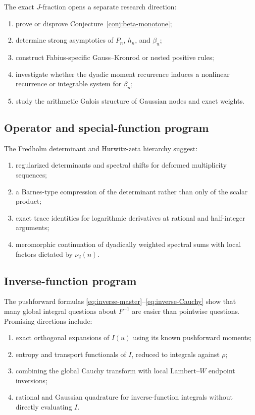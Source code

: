 \documentclass[11pt]{article}
\theoremstyle{definition}
\theoremstyle{remark}
\begin{document}
The exact \(J\)-fraction opens a separate research direction:

\begin{enumerate}
\item prove or disprove Conjecture~\ref{conj:beta-monotone};
\item determine strong asymptotics of \(P_n\), \(h_n\), and \(\beta_n\);
\item construct Fabius-specific Gauss--Kronrod or nested positive rules;
\item investigate whether the dyadic moment recurrence induces a nonlinear recurrence or
      integrable system for \(\beta_n\);
\item study the arithmetic Galois structure of Gaussian nodes and exact weights.
\end{enumerate}

\subsection{Operator and special-function program}

The Fredholm determinant and Hurwitz-zeta hierarchy suggest:

\begin{enumerate}
\item regularized determinants and spectral shifts for deformed multiplicity sequences;
\item a Barnes-type compression of the determinant rather than only of the scalar product;
\item exact trace identities for logarithmic derivatives at rational and half-integer
      arguments;
\item meromorphic continuation of dyadically weighted spectral sums with local factors
      dictated by \(\nu_2(n)\).
\end{enumerate}

\subsection{Inverse-function program}

The pushforward formulas \eqref{eq:inverse-master}--\eqref{eq:inverse-Cauchy} show that
many global integral questions about \(F^{-1}\) are easier than pointwise questions.
Promising directions include:

\begin{enumerate}
\item exact orthogonal expansions of \(I(u)\) using its known pushforward moments;
\item entropy and transport functionals of \(I\), reduced to integrals against \(\rho\);
\item combining the global Cauchy transform with local Lambert--\(W\) endpoint inversions;
\item rational and Gaussian quadrature for inverse-function integrals without directly
      evaluating \(I\).
\end{enumerate}
\end{document}
